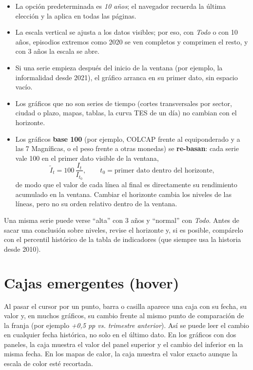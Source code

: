 \begin{itemize}
\item La opción predeterminada es \emph{10 años}; el navegador recuerda la última elección y la aplica en
  todas las páginas.
\item La escala vertical se ajusta a los datos visibles; por eso, con \emph{Todo} o con 10 años, episodios
  extremos como 2020 se ven completos y comprimen el resto, y con 3 años la escala se abre.
\item Si una serie empieza después del inicio de la ventana (por ejemplo, la informalidad desde 2021), el
  gráfico arranca en su primer dato, sin espacio vacío.
\item Los gráficos que no son series de tiempo (cortes transversales por sector, ciudad o plazo, mapas,
  tablas, la curva TES de un día) no cambian con el horizonte.
\item Los gráficos \textbf{base 100} (por ejemplo, COLCAP frente al equiponderado y a las 7 Magníficas, o el
  peso frente a otras monedas) se \textbf{re-basan}: cada serie vale 100 en el primer dato visible de la ventana,
  \[
  \tilde I_t = 100\,\frac{I_t}{I_{t_0}},\qquad t_0=\text{primer dato dentro del horizonte},
  \]
  de modo que el valor de cada línea al final es directamente su rendimiento acumulado en la ventana. Cambiar
  el horizonte cambia los niveles de las líneas, pero no su orden relativo dentro de la ventana.
\end{itemize}

\begin{alerta}
Una misma serie puede verse ``alta'' con 3 años y ``normal'' con \emph{Todo}. Antes de sacar una conclusión
sobre niveles, revise el horizonte y, si es posible, compárelo con el percentil histórico de la tabla de
indicadores (que siempre usa la historia desde 2010).
\end{alerta}

\section{Cajas emergentes (hover)}
Al pasar el cursor por un punto, barra o casilla aparece una caja con su fecha, su valor y, en muchos gráficos,
su cambio frente al mismo punto de comparación de la franja (por ejemplo \emph{ +0,5 pp vs. trimestre
anterior}). Así se puede leer el cambio en cualquier fecha histórica, no solo en el último dato. En los gráficos
con dos paneles, la caja muestra el valor del panel superior y el cambio del inferior en la misma fecha. En los
mapas de calor, la caja muestra el valor exacto aunque la escala de color esté recortada.

